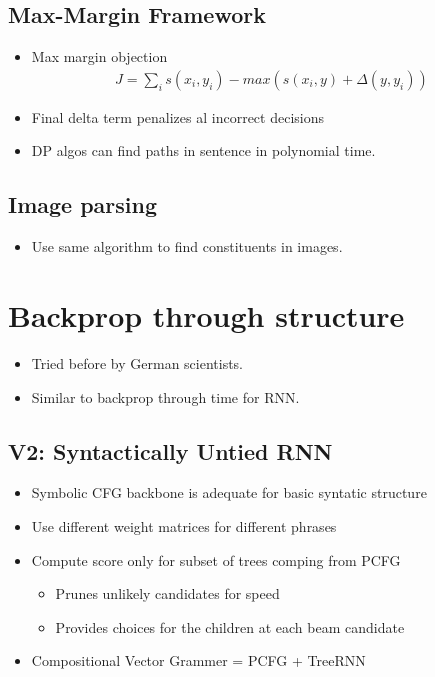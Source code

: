 \documentclass[a4paper]{article}
\begin{document}
\subsection{Max-Margin Framework}
\begin{itemize}
    \item Max margin objection
    \begin{equation}
    \begin{split}
        J = \sum_{i} s(x_i, y_i) - max(s(x_i,y) + \Delta(y, y_i))
    \end{split}
    \end{equation}
    \item Final delta term penalizes al incorrect decisions
    \item DP algos can find paths in sentence in polynomial time.
\end{itemize}
\subsection{Image parsing}
\begin{itemize}
    \item Use same algorithm to find constituents in images.
\end{itemize}
\section{Backprop through structure}
\begin{itemize}
    \item Tried before by German scientists.
    \item Similar to backprop through time for RNN.
\end{itemize}
\subsection{V2: Syntactically Untied RNN}
\begin{itemize}
    \item Symbolic CFG backbone is adequate for basic syntatic structure
    \item Use different weight matrices for different phrases
    \item Compute score only for subset of trees comping from PCFG
    \begin{itemize}
        \item Prunes unlikely candidates for speed
        \item Provides choices for the children at each beam candidate
    \end{itemize}
    \item Compositional Vector Grammer = PCFG + TreeRNN
\end{itemize}
\end{document}
